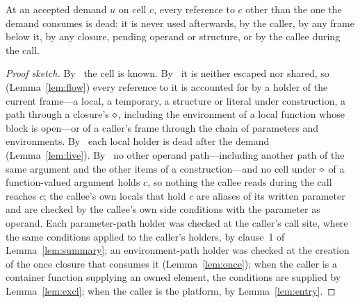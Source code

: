 \begin{lemma}
\label{lem:dead}
At an accepted demand $u$ on cell $c$, every reference to $c$ other than the one the demand consumes is
dead: it is never used afterwards, by the caller, by any frame below it, by any closure, pending
operand or structure, or by the callee during the call.
\end{lemma}
\begin{proof}[Proof sketch]
By \Known\ the cell is known. By \Unescaped\ it is neither escaped nor shared, so (Lemma~\ref{lem:flow})
every reference to it is accounted for by a holder of the current frame---a local, a temporary, a
structure or literal under construction, a path through a closure's $\diamond$, including the environment of
a local function whose block is open---or of a caller's frame through the chain of parameters and
environments. By \Dead\ each local holder is dead after the demand (Lemma~\ref{lem:live}). By \Disjoint\
no other operand path---including another path of the same argument and the other items of a
construction---and no cell under $\diamond$ of a function-valued argument holds $c$, so nothing the callee
reads during the call reaches $c$; the callee's own locals that hold $c$ are aliases of its written
parameter and are checked by the callee's own side conditions with the parameter as operand. Each
parameter-path holder was checked at the caller's call site, where the same conditions applied to the
caller's holders, by clause~1 of Lemma~\ref{lem:summary}; an environment-path holder was checked at the
creation of the once closure that consumes it (Lemma~\ref{lem:once}); when the caller is a container
function supplying an owned element, the conditions are supplied by Lemma~\ref{lem:excl}; when the caller
is the platform, by Lemma~\ref{lem:entry}.
\end{proof}

